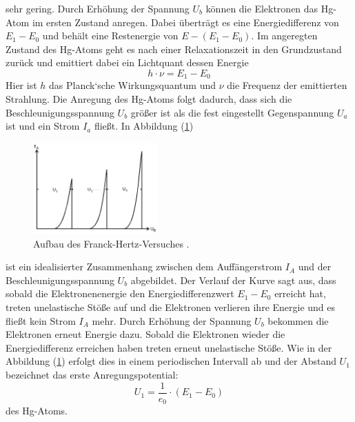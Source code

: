 sehr gering.
Durch Erhöhung der Spannung $U_b$ können die Elektronen das Hg-Atom im ersten Zustand anregen.
Dabei überträgt es eine Energiedifferenz von $E_1 - E_0$ und behält eine Restenergie von  $E -(E_1 -E_0)$.
Im angeregten Zustand des Hg-Atoms geht es nach einer Relaxationszeit in den Grundzustand zurück und
emittiert dabei ein Lichtquant dessen Energie
\begin{equation}
  h \cdot \nu = E_1 -E_0
\label{eq:3}
\end{equation}
Hier ist $h$ das Planck‘sche Wirkungsquantum und $\nu$ die Frequenz der emittierten Strahlung.
Die Anregung des Hg-Atoms folgt dadurch, dass sich die Beschleunigungsspannung $U_b$ größer ist als die
fest eingestellt Gegenspannung $U_a$ ist und ein Strom $I_a$ fließt.
In Abbildung (\ref{abb:2})
\begin{figure}[H]
\centering
\includegraphics[width =5 cm, height = 3.5cm]{content/Verlauf.jpg}
\caption{Aufbau des Franck-Hertz-Versuches \cite{1}.}
\label{abb:2}
\end{figure}
ist ein idealisierter Zusammenhang zwischen dem Auffängerstrom $I_A$ und
der Beschleunigungsspannung $U_b$ abgebildet.
Der Verlauf der Kurve sagt aus, dass sobald die Elektronenenergie den Energiedifferenzwert $E_1 - E_0$ erreicht hat, treten
unelastische Stöße auf und die Elektronen verlieren ihre Energie und es fließt kein Strom $I_A$ mehr.
Durch Erhöhung der Spannung $U_b$ bekommen die Elektronen erneut Energie dazu.
Sobald die Elektronen wieder die Energiedifferenz erreichen haben treten erneut unelastische Stöße.
Wie in der Abbildung (\ref{abb:2}) erfolgt dies in einem periodischen Intervall ab und
der Abstand $U_1$ bezeichnet das erste Anregungspotential:
\begin{equation}
  U_1 = \frac{1}{e_0} \cdot (E_1 - E_0)
  \label{eq:3}
\end{equation}
des Hg-Atoms.
